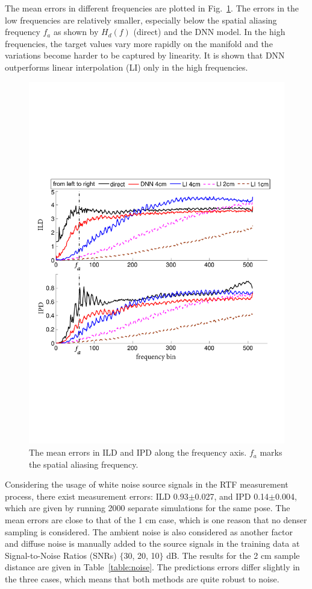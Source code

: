 \documentclass[journal]{IEEEtran}
\begin{document}
The mean errors in different frequencies are plotted in Fig.~\ref{fig:err-freq}. The errors in the low frequencies are relatively smaller, especially below the spatial aliasing frequency $f_a$ as shown by $H_d(f)$ (direct) and the DNN model. In the high frequencies, the target values vary more rapidly on the manifold and the variations become harder to be captured by linearity. It is shown that DNN outperforms linear interpolation (LI) only in the high frequencies.

\begin{figure}[!t]
\centering
\includegraphics[width=0.95\linewidth]{fig3_error_along_freq.pdf}
\caption{The mean errors in ILD and IPD along the frequency axis. $f_a$ marks the spatial aliasing frequency.}
\label{fig:err-freq}
\end{figure}

Considering the usage of white noise source signals in the RTF measurement process, there exist measurement errors: ILD 0.93$\pm$0.027, and IPD 0.14$\pm$0.004, which are given by running 2000 separate simulations for the same pose. The mean errors are close to that of the 1 cm case, which is one reason that no denser sampling is considered. The ambient noise is also considered as another factor and diffuse noise is manually added to the source signals in the training data at Signal-to-Noise Ratios (SNRs) $\{$30, 20, 10$\}$ dB. The results for the 2 cm sample distance are given in Table~\ref{table:noise}. The predictions errors differ slightly in the three cases, which means that both methods are quite robust to noise.
\end{document}
